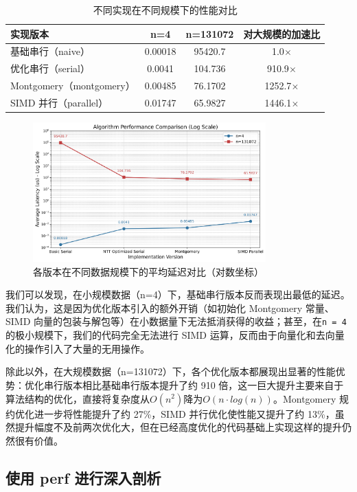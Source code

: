 \documentclass[a4paper]{article}
\begin{document}
\begin{table}[h]
\centering
\begin{tabular}{|l|c|c|c|}
\hline
实现版本 & n=4 & n=131072 & 对大规模的加速比 \\ \hline
基础串行（naive） & 0.00018 & 95420.7 & 1.0$\times$ \\ \hline
优化串行（serial） & 0.0041 & 104.736 & 910.9$\times$ \\ \hline
Montgomery（montgomery） & 0.00485 & 76.1702 & 1252.7$\times$ \\ \hline
SIMD 并行（parallel） & 0.01747 & 65.9827 & 1446.1$\times$ \\ \hline
\end{tabular}
\caption{不同实现在不同规模下的性能对比}
\label{t1}
\end{table}

\begin{figure}[h]
    \centering
    \includegraphics[width=0.8\textwidth]{image/2.png}
    \caption{各版本在不同数据规模下的平均延迟对比（对数坐标）}
    \label{\p1}
\end{figure}

我们可以发现，在小规模数据（n=4）下，基础串行版本反而表现出最低的延迟。我们认为，这是因为优化版本引入的额外开销（如初始化 Montgomery 常量、SIMD 向量的包装与解包等）在小数据量下无法抵消获得的收益；甚至，在\texttt{n = 4}的极小规模下，我们的代码完全无法进行 SIMD 运算，反而由于向量化和去向量化的操作引入了大量的无用操作。

除此以外，在大规模数据（n=131072）下，各个优化版本都展现出显著的性能优势：优化串行版本相比基础串行版本提升了约 910 倍，这一巨大提升主要来自于算法结构的优化，直接将复杂度从$O(n^2)$降为$O(n\cdot log(n))$。Montgomery 规约优化进一步将性能提升了约 27\%，SIMD 并行优化使性能又提升了约 13\%，虽然提升幅度不及前两次优化大，但在已经高度优化的代码基础上实现这样的提升仍然很有价值。

\subsection{使用 perf 进行深入剖析}
\end{document}
